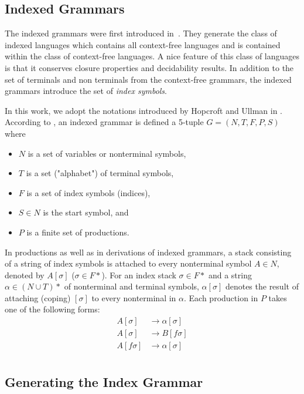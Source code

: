 \subsection{Indexed Grammars}\label{func:preliminaries-index} 

The indexed grammars were first introduced in~\cite{Aho67}. They generate the class of indexed languages which contains all context-free languages and is contained within the class of context-free languages.  A nice feature of this class of languages  is that it conserves closure properties and decidability results. In addition to the set of terminals and non terminals from the context-free grammars, the indexed grammars introduce the set of {\em index symbols}.  

In this work, we adopt the notations introduced by Hopcroft and Ullman in \cite{}. According to \cite{}, an indexed grammar is defined a 5-tuple $G = (N,T,F,P,S)$ where
\begin{itemize}
\item $N$ is a set of variables or nonterminal symbols,
\item $T$ is a set ("alphabet") of terminal symbols,
\item $F$ is a set of index symbols (indices),
\item $S \in N$  is the start symbol, and
\item $P$ is a finite set of productions.
\end{itemize}

In productions as well as in derivations of indexed grammars, a stack consisting of a string of index symbols is attached to every nonterminal symbol $A \in N$, denoted by $A[\sigma]$ ($\sigma \in F*$).  For an index stack $\sigma \in F*$ and a string $\alpha \in (N \cup T)*$ of nonterminal and terminal symbols, $\alpha[\sigma]$ denotes the result of attaching (coping) $[\sigma]$ to every nonterminal in $\alpha$.  Each production in $P$ takes one of the following forms:
\begin{align*}
A[\sigma] &\rightarrow \alpha[\sigma]\\
A[\sigma] & \rightarrow B[f\sigma]\\
A[f\sigma] & \rightarrow \alpha[\sigma]\\
\end{align*}




\subsection{Generating the Index Grammar}

